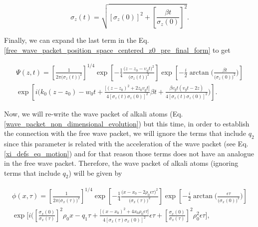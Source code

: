 \documentclass{article}
\begin{document}
\begin{equation}\label{free_wave_packet_width} 
\sigma_{z}(t) = \sqrt{[\sigma_{z}(0)]^{2} + \left[\frac{\beta t}{\sigma_{z}(0)} \right]^{2}}.
\end{equation}

Finally, we can expand the last term in the Eq. \ref{free_wave_packet_position_space_centered_z0_pre_final_form} to get

\begin{multline}\label{free_wave_packet_position_space_centered_z0_final_form} 
    \Psi (z, t) = \left[\frac{1}{2 \pi \big(\sigma_{z}(t)\big)^2} \right]^{1/4} \exp \left[-\frac{1}{4} \frac{ \big(z - z_{0} - \upsilon_{g} t \big)^{2}}{\big(\sigma_{z}(t)\big)^{2}} \right] \exp \left[-\frac{i}{2} \arctan\Bigg(\frac{\beta t }{\big(\sigma_{z}(0)\big)^{2}}\Bigg) \right] \\ \exp \left[i \Bigg(k_{0}(z-z_{0}) - w_{0}t + \frac{ \big[(z - z_{0} )^{2} + 2 z_{0} v_{g} t \big]}{ 4[\sigma_{z}(t)\sigma_{z}(0)]^{2}}\beta t + \frac{\beta v_{g} t (v_{g} t - 2z)}{4[\sigma_{z}(t)\sigma_{z}(0)]^{2}} \Bigg) \right].
\end{multline}

Now, we will re-write the wave packet of alkali atoms (Eq. \ref{wave_packet_non_dimensional_evolution}) but this time, in order to establish the connection with the free wave packet, we will ignore the terms that include $q_{2}$ since this parameter is related with the acceleration of the wave packet (see Eq. \ref{xi_defs_eq_motion}) and for that reason those terms does not have an analogue in the free wave packet. Therefore, the wave packet of alkali atoms (ignoring terms that include $q_{2}$) will be given by

\begin{multline}\label{alkali_wave_packet_position_space_final_form} 
    \phi (x, \tau) = \left[\frac{1}{2 \pi \big(\sigma_{x}(\tau)\big)^2} \right]^{1/4} \exp \left[-\frac{1}{4} \frac{ \big(x - x_{0} - 2\rho_{0} \epsilon \tau \big)^{2}}{\big(\sigma_{x}(\tau)\big)^{2}} \right] \exp \left[-\frac{i}{2} \arctan\Bigg(\frac{\epsilon \tau}{\big(\sigma_{x}(0)\big)^{2}}\Bigg) \right] \\ \exp \Bigg[i \bigg(\left[\frac{\sigma_{x}(0)}{\sigma_{x}(\tau)} \right]^{2} \rho_{0}x - q_{1}\tau + \frac{\big[(x-x_{0})^{2} + 4 x_{0} \rho_{0} \epsilon \tau \big]}{ 4[\sigma_{x}(\tau)\sigma_{x}(0)]^{2}} \epsilon \tau + \left[\frac{\sigma_{x}(0)}{\sigma_{x}(\tau)} \right]^{2} \rho_{0}^{2} \epsilon \tau \Bigg],
\end{multline}
\end{document}
